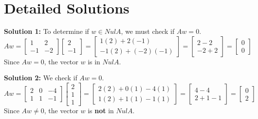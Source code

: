 \documentclass[11pt]{article}
\begin{document}
\newpage

\section{Detailed Solutions}

\textbf{Solution 1:} To determine if $w \in Nul A$, we must check if $Aw = 0$.
$$ Aw = \begin{bmatrix} 1 & 2 \\ -1 & -2 \end{bmatrix} \begin{bmatrix} 2 \\ -1 \end{bmatrix} = \begin{bmatrix} 1(2) + 2(-1) \\ -1(2) + (-2)(-1) \end{bmatrix} = \begin{bmatrix} 2 - 2 \\ -2 + 2 \end{bmatrix} = \begin{bmatrix} 0 \\ 0 \end{bmatrix} $$
Since $Aw = 0$, the vector $w$ is in $Nul A$.

\vspace{0.3cm}
\textbf{Solution 2:} We check if $Aw = 0$.
$$ Aw = \begin{bmatrix} 2 & 0 & -4 \\ 1 & 1 & -1 \end{bmatrix} \begin{bmatrix} 2 \\ 1 \\ 1 \end{bmatrix} = \begin{bmatrix} 2(2) + 0(1) - 4(1) \\ 1(2) + 1(1) - 1(1) \end{bmatrix} = \begin{bmatrix} 4 - 4 \\ 2 + 1 - 1 \end{bmatrix} = \begin{bmatrix} 0 \\ 2 \end{bmatrix} $$
Since $Aw \neq 0$, the vector $w$ is \textbf{not} in $Nul A$.
\end{document}
